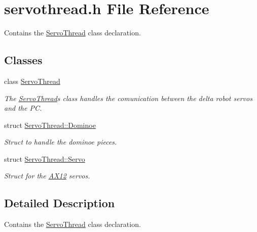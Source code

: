 \hypertarget{a00021}{}\section{servothread.\+h File Reference}
\label{a00021}


Contains the \hyperlink{a00008}{Servo\+Thread} class declaration.  


\subsection*{Classes}
\begin{DoxyCompactItemize}
\item 
class \hyperlink{a00008}{Servo\+Thread}
\begin{DoxyCompactList}\small\item\em The \hyperlink{a00008}{Servo\+Thread}\textquotesingle{}s class handles the comunication between the delta robot servos and the P\+C. \end{DoxyCompactList}\item 
struct \hyperlink{a00002}{Servo\+Thread\+::\+Dominoe}
\begin{DoxyCompactList}\small\item\em Struct to handle the dominoe pieces. \end{DoxyCompactList}\item 
struct \hyperlink{a00007}{Servo\+Thread\+::\+Servo}
\begin{DoxyCompactList}\small\item\em Struct for the \hyperlink{a00001}{A\+X12} servos. \end{DoxyCompactList}\end{DoxyCompactItemize}


\subsection{Detailed Description}
Contains the \hyperlink{a00008}{Servo\+Thread} class declaration. 

